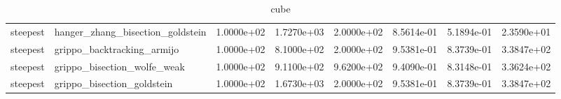 \documentclass[a4paper,11pt]{article}
\numberwithin{equation}{section} %
\begin{document}
\begin{table}[h!]
{\begin{tabular}{|l|l|l|l|l|l|l|l|}
        steepest & hanger\_zhang\_bisection\_goldstein & 1.0000e+02 & 1.7270e+03 & 2.0000e+02 & 8.5614e-01 & 5.1894e-01 & 2.3590e+01 \\
        steepest & grippo\_backtracking\_armijo & 1.0000e+02 & 8.1000e+02 & 2.0000e+02 & 9.5381e-01 & 8.3739e-01 & 3.3847e+02 \\
        steepest & grippo\_bisection\_wolfe\_weak & 1.0000e+02 & 9.1100e+02 & 9.6200e+02 & 9.4090e-01 & 8.3148e-01 & 3.3624e+02 \\
        steepest & grippo\_bisection\_goldstein & 1.0000e+02 & 1.6730e+03 & 2.0000e+02 & 9.5381e-01 & 8.3739e-01 & 3.3847e+02 \\

\end{tabular}}
\caption{cube}
\label{table:cube}
\end{table}
\end{document}
